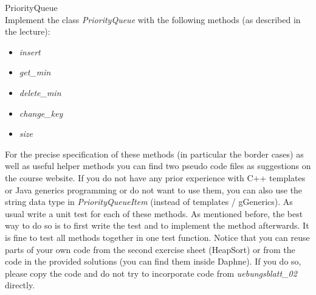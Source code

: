 PriorityQueue \\
Implement the class \textit{PriorityQueue} with the following methods
(as described in the lecture):
\begin{itemize}
  \item\textit{insert} 
  \item\textit{get\_min} 
  \item\textit{delete\_min} 
  \item\textit{change\_key} 
  \item\textit{size} 
\end{itemize}
For the precise specification of these methods
(in particular the border cases)
as well as useful helper methods you can find two pseudo code files as 
suggestions on the course website.
If you do not have any prior experience with C++ templates or Java generics
programming or do not want to use them,
you can also use the string data type in \textit{PriorityQueueItem}
(instead of templates / gGenerics).
As usual write a unit test for each of these methods.
As mentioned before, the best way to do so is to first write the test and to
implement the method afterwards.
It is fine to test all methods together in one test function.
Notice that you can reuse parts of your own code from the second exercise sheet
(HeapSort) or from the code in the provided solutions
(you can find them inside Daphne).
If you do so, please copy the code and do not try to incorporate code from
\textit{uebungsblatt\_02} directly.
